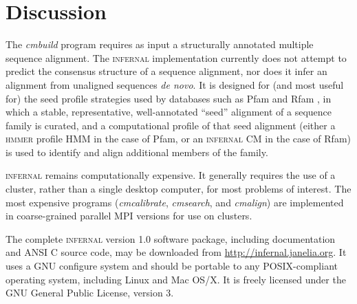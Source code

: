 \section{Discussion}

The \emph{cmbuild} program requires as input a structurally annotated
multiple sequence alignment. The \textsc{infernal} implementation
currently does not attempt to predict the consensus structure of a
sequence alignment, nor does it infer an alignment from unaligned
sequences \emph{de novo}. It is designed for (and most useful for) the
seed profile strategies used by databases such as Pfam and Rfam
\citep{Finn08,Gardner09}, in which a stable, representative,
well-annotated ``seed'' alignment of a sequence family is curated, and
a computational profile of that seed alignment (either a
\textsc{hmmer} profile HMM in the case of Pfam, or an
\textsc{infernal} CM in the case of Rfam) is used to identify and
align additional members of the family.

\textsc{infernal} remains computationally expensive. It generally
requires the use of a cluster, rather than a single desktop computer,
for most problems of interest. The most expensive programs
(\emph{cmcalibrate}, \emph{cmsearch}, and \emph{cmalign}) are
implemented in coarse-grained parallel MPI versions for use on
clusters. 

The complete \textsc{infernal} version 1.0 software package, including
documentation and ANSI C source code, may be downloaded from
\url{http://infernal.janelia.org}. It uses a GNU configure system and
should be portable to any POSIX-compliant operating system, including
Linux and Mac OS/X. It is freely licensed under the GNU General Public
License, version 3.
